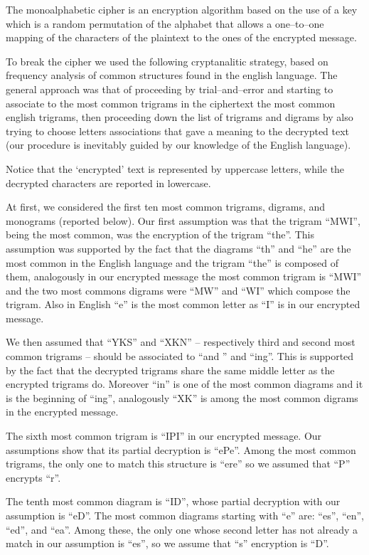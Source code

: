 \documentclass[12pt]{article}
\begin{document}
The monoalphabetic cipher is an encryption algorithm based on the use of a key which is a random permutation of the alphabet that allows a one–to–one mapping of the characters of the plaintext to the ones of the encrypted message. 

To break the cipher we used the following cryptanalitic strategy, based on  frequency analysis of common structures found in the english language. The general approach was that of proceeding by trial–and–error and starting to associate to the most common trigrams in the ciphertext the most common english trigrams, then proceeding down the list of trigrams and digrams by also trying to choose letters associations that gave a meaning to the decrypted text (our procedure is inevitably guided by our knowledge of the English language).

Notice that the `encrypted' text is represented by uppercase letters, while the decrypted characters are reported in lowercase.

At first, we considered the first ten most common trigrams, digrams, and monograms (reported below). Our first assumption was that the trigram “MWI”, being the most common, was the encryption of the trigram “the”. This assumption was supported by the fact that the diagrams “th” and “he” are the most common in the English language and the trigram “the” is composed of them, analogously in our encrypted message the most common trigram is “MWI” and the two most commons digrams were “MW” and “WI”  which compose the trigram. Also in English  “e” is the most common letter as “I” is in our encrypted message.

We then assumed that “YKS” and “XKN” – respectively third and second most common trigrams – should be associated to “and ” and “ing”. This is supported by the fact that the decrypted trigrams share the same middle letter as the encrypted trigrams do. Moreover “in” is one of the most common diagrams and it is the beginning of “ing”, analogously “XK” is among the most common digrams in the encrypted message.

The sixth most common trigram is “IPI” in our encrypted message. Our assumptions show that its partial decryption is “ePe”. Among the most common trigrams, the only one to match this structure is “ere” so we assumed that “P” encrypts “r”.  

The tenth most common diagram is “ID”, whose partial decryption with our assumption is “eD”. The most common diagrams starting with “e” are: “es”, “en”, “ed”, and “ea”. Among these, the only one whose second letter has not already a match in our assumption is “es”, so we assume that “s” encryption is “D”. 
\end{document}
